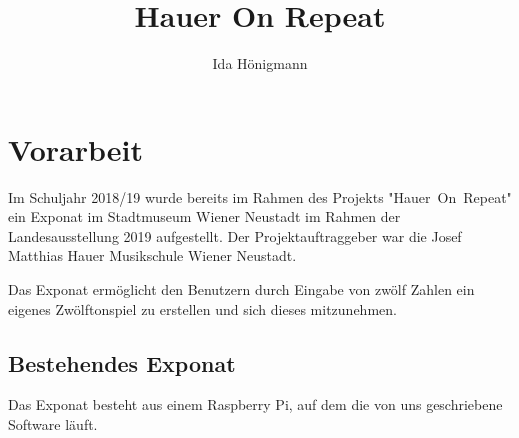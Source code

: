\documentclass[]{article}
\title{Hauer On Repeat}
\author{Ida Hönigmann}
\begin{document}
\maketitle
\newpage
\tableofcontents
\newpage

\section{Vorarbeit}
Im Schuljahr 2018/19 wurde bereits im Rahmen des Projekts \mbox{"Hauer On Repeat"} ein Exponat im Stadtmuseum Wiener Neustadt im Rahmen der Landesausstellung 2019 aufgestellt. Der Projektauftraggeber war die Josef Matthias Hauer Musikschule Wiener Neustadt.

Das Exponat ermöglicht den Benutzern durch Eingabe von zwölf Zahlen ein eigenes Zwölftonspiel zu erstellen und sich dieses mitzunehmen.

\subsection{Bestehendes Exponat}
Das Exponat besteht aus einem Raspberry Pi, auf dem die von uns geschriebene Software läuft.
\end{document}
